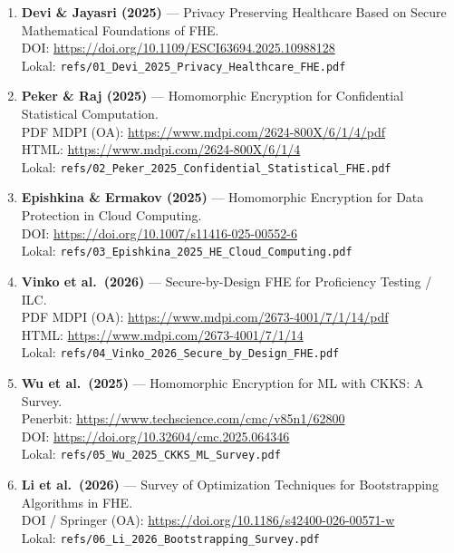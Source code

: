 \documentclass[11pt,a4paper]{article}
\begin{document}
\begin{enumerate}[leftmargin=1.6em,itemsep=0.85em]
  \item \textbf{Devi \& Jayasri (2025)} --- Privacy Preserving Healthcare Based on Secure Mathematical Foundations of FHE.\\
  DOI: \url{https://doi.org/10.1109/ESCI63694.2025.10988128}\\
  Lokal: \texttt{refs/01\_Devi\_2025\_Privacy\_Healthcare\_FHE.pdf}

  \item \textbf{Peker \& Raj (2025)} --- Homomorphic Encryption for Confidential Statistical Computation.\\
  PDF MDPI (OA): \url{https://www.mdpi.com/2624-800X/6/1/4/pdf}\\
  HTML: \url{https://www.mdpi.com/2624-800X/6/1/4}\\
  Lokal: \texttt{refs/02\_Peker\_2025\_Confidential\_Statistical\_FHE.pdf}

  \item \textbf{Epishkina \& Ermakov (2025)} --- Homomorphic Encryption for Data Protection in Cloud Computing.\\
  DOI: \url{https://doi.org/10.1007/s11416-025-00552-6}\\
  Lokal: \texttt{refs/03\_Epishkina\_2025\_HE\_Cloud\_Computing.pdf}

  \item \textbf{Vinko et al.\ (2026)} --- Secure-by-Design FHE for Proficiency Testing / ILC.\\
  PDF MDPI (OA): \url{https://www.mdpi.com/2673-4001/7/1/14/pdf}\\
  HTML: \url{https://www.mdpi.com/2673-4001/7/1/14}\\
  Lokal: \texttt{refs/04\_Vinko\_2026\_Secure\_by\_Design\_FHE.pdf}

  \item \textbf{Wu et al.\ (2025)} --- Homomorphic Encryption for ML with CKKS: A Survey.\\
  Penerbit: \url{https://www.techscience.com/cmc/v85n1/62800}\\
  DOI: \url{https://doi.org/10.32604/cmc.2025.064346}\\
  Lokal: \texttt{refs/05\_Wu\_2025\_CKKS\_ML\_Survey.pdf}

  \item \textbf{Li et al.\ (2026)} --- Survey of Optimization Techniques for Bootstrapping Algorithms in FHE.\\
  DOI / Springer (OA): \url{https://doi.org/10.1186/s42400-026-00571-w}\\
  Lokal: \texttt{refs/06\_Li\_2026\_Bootstrapping\_Survey.pdf}


\end{enumerate}
\end{document}
